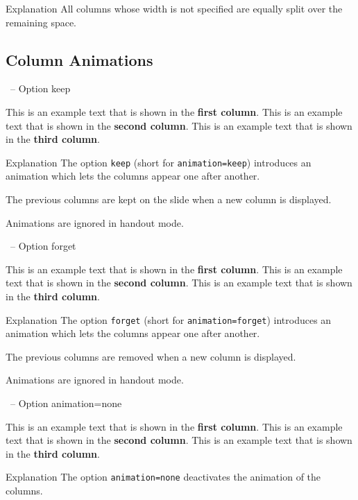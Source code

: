 \documentclass[
	aspectratio=169, %
	8pt, %
]{beamer}
\begin{document}
{\begin{frame}{\insertsubsection}
\begin{note}{Explanation}
		All columns whose width is not specified are equally split over the remaining space.
	\end{note}
\end{frame}

\subsection{Column Animations}
\begin{frame}{\insertsubsection\ -- Option keep}
	\begin{mycolumns}[columns=3,keep] %
		This is an example text that is shown in the \textbf{first column}.
	\mynextcolumn
		This is an example text that is shown in the \textbf{second column}.
	\mynextcolumn
		This is an example text that is shown in the \textbf{third column}.
	\end{mycolumns}
	\vfill
	\begin{note}{Explanation}
		The option \texttt{keep} (short for \texttt{animation=keep}) introduces an animation which lets the columns appear one after another.

		The previous columns are kept on the slide when a new column is displayed.

		Animations are ignored in handout mode.
	\end{note}
\end{frame}

\begin{frame}{\insertsubsection\ -- Option forget}
	\begin{mycolumns}[columns=3,forget] %
		This is an example text that is shown in the \textbf{first column}.
	\mynextcolumn
		This is an example text that is shown in the \textbf{second column}.
	\mynextcolumn
		This is an example text that is shown in the \textbf{third column}.
	\end{mycolumns}
	\vfill
	\begin{note}{Explanation}
		The option \texttt{forget} (short for \texttt{animation=forget}) introduces an animation which lets the columns appear one after another.

		The previous columns are removed when a new column is displayed.

		Animations are ignored in handout mode.
	\end{note}
\end{frame}

\begin{frame}{\insertsubsection\ -- Option animation=none}
	\begin{mycolumns}[columns=3,animation=none]
		This is an example text that is shown in the \textbf{first column}.
	\mynextcolumn
		This is an example text that is shown in the \textbf{second column}.
	\mynextcolumn
		This is an example text that is shown in the \textbf{third column}.
	\end{mycolumns}
	\vfill
	\begin{note}{Explanation}
		The option \texttt{animation=none} deactivates the animation of the columns.


\end{note}
\end{frame}}
\end{document}
